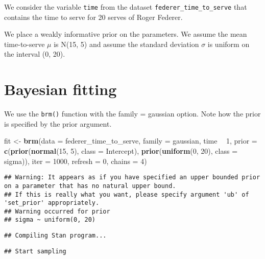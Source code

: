 \documentclass[
]{book}
\newenvironment{Shaded}{\begin{snugshade}}{\end{snugshade}}
\newcommand{\DataTypeTok}[1]{\textcolor[rgb]{0.13,0.29,0.53}{#1}}
\newcommand{\DecValTok}[1]{\textcolor[rgb]{0.00,0.00,0.81}{#1}}
\newcommand{\KeywordTok}[1]{\textcolor[rgb]{0.13,0.29,0.53}{\textbf{#1}}}
\newcommand{\NormalTok}[1]{#1}
\newcommand{\OperatorTok}[1]{\textcolor[rgb]{0.81,0.36,0.00}{\textbf{#1}}}
\newcommand{\StringTok}[1]{\textcolor[rgb]{0.31,0.60,0.02}{#1}}
\begin{document}
We consider the variable \texttt{time} from the dataset \texttt{federer\_time\_to\_serve} that contains the time to serve for 20 serves of Roger Federer.

We place a weakly informative prior on the parameters. We assume the mean time-to-serve \(\mu\) is N(15, 5) and assume the standard deviation \(\sigma\) is uniform on the interval (0, 20).

\hypertarget{bayesian-fitting}{%
\section{Bayesian fitting}\label{bayesian-fitting}}

We use the \texttt{brm()} function with the family = gaussian option. Note how the prior is specified by the prior argument.

\begin{Shaded}
\begin{Highlighting}[]
\NormalTok{fit <-}\StringTok{ }\KeywordTok{brm}\NormalTok{(}\DataTypeTok{data =}\NormalTok{ federer_time_to_serve, }
            \DataTypeTok{family =}\NormalTok{ gaussian,}
\NormalTok{            time }\OperatorTok{~}\StringTok{ }\DecValTok{1}\NormalTok{,}
    \DataTypeTok{prior =} \KeywordTok{c}\NormalTok{(}\KeywordTok{prior}\NormalTok{(}\KeywordTok{normal}\NormalTok{(}\DecValTok{15}\NormalTok{, }\DecValTok{5}\NormalTok{), }\DataTypeTok{class =}\NormalTok{ Intercept),}
              \KeywordTok{prior}\NormalTok{(}\KeywordTok{uniform}\NormalTok{(}\DecValTok{0}\NormalTok{, }\DecValTok{20}\NormalTok{), }\DataTypeTok{class =}\NormalTok{ sigma)),}
    \DataTypeTok{iter =} \DecValTok{1000}\NormalTok{, }\DataTypeTok{refresh =} \DecValTok{0}\NormalTok{, }\DataTypeTok{chains =} \DecValTok{4}\NormalTok{)}
\end{Highlighting}
\end{Shaded}

\begin{verbatim}
## Warning: It appears as if you have specified an upper bounded prior on a parameter that has no natural upper bound.
## If this is really what you want, please specify argument 'ub' of 'set_prior' appropriately.
## Warning occurred for prior 
## sigma ~ uniform(0, 20)
\end{verbatim}

\begin{verbatim}
## Compiling Stan program...
\end{verbatim}

\begin{verbatim}
## Start sampling
\end{verbatim}
\end{document}
